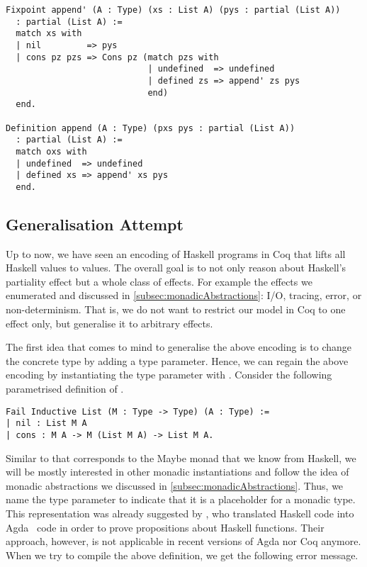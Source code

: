 \begin{verbatim}
Fixpoint append' (A : Type) (xs : List A) (pys : partial (List A))
  : partial (List A) :=
  match xs with
  | nil         => pys
  | cons pz pzs => Cons pz (match pzs with
                            | undefined  => undefined
                            | defined zs => append' zs pys
                            end)
  end.

Definition append (A : Type) (pxs pys : partial (List A))
  : partial (List A) :=
  match oxs with
  | undefined  => undefined
  | defined xs => append' xs pys
  end.
\end{verbatim}

\subsection{Generalisation Attempt}
\label{subsec:genericLifting}

Up to now, we have seen an encoding of Haskell programs in Coq that lifts all Haskell values to  values.
The overall goal is to not only reason about Haskell's partiality effect but a whole class of effects.
For example the effects we enumerated and discussed in \autoref{subsec:monadicAbstractions}: I/O, tracing, error, or non\--determinism.
That is, we do not want to restrict our model in Coq to one effect only, but generalise it to arbitrary effects.

The first idea that comes to mind to generalise the above encoding is to change the concrete type  by adding a type parameter.
Hence, we can regain the above encoding by instantiating the type parameter with .
Consider the following parametrised definition of .

\begin{verbatim}
Fail Inductive List (M : Type -> Type) (A : Type) :=
| nil : List M A
| cons : M A -> M (List M A) -> List M A.
\end{verbatim}

Similar to  that corresponds to the Maybe monad that we know from Haskell, we will be mostly interested in other monadic instantiations and follow the idea of monadic abstractions we discussed in \autoref{subsec:monadicAbstractions}.
Thus, we name the type parameter  to indicate that it is a placeholder for a monadic type.
This representation was already suggested by \citet{abel2005verifying}, who translated Haskell code into Agda~\citep{norell2008dependently} code in order to prove propositions about Haskell functions.
Their approach, however, is not applicable in recent versions of Agda nor Coq anymore.
When we try to compile the above definition, we get the following error message.

